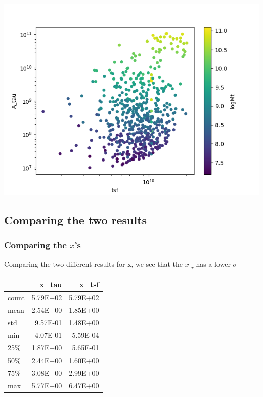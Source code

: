 \documentclass[a4paper,twocolumn]{article}
\begin{document}
\begin{center}
\includegraphics[width=.9\linewidth]{figs/T-A_tau.png}
\end{center}

\subsection{Comparing the two results}
\label{sec:org2d98e85}

\subsubsection{Comparing the \(x\)'s}
\label{sec:org7c16f4c}


Comparing the two different results for x, we see that the \(x|_\tau\) has a lower \(\sigma\)

\begin{table}[hc]
\centering
\begin{tabular}{lrr}
\toprule
{} &    x\_tau &    x\_tsf \\
\midrule
count & 5.79E+02 & 5.79E+02 \\
mean  & 2.54E+00 & 1.85E+00 \\
std   & 9.57E-01 & 1.48E+00 \\
min   & 4.07E-01 & 5.59E-04 \\
25\%   & 1.87E+00 & 5.65E-01 \\
50\%   & 2.44E+00 & 1.60E+00 \\
75\%   & 3.08E+00 & 2.99E+00 \\
max   & 5.77E+00 & 6.47E+00 \\
\bottomrule
\end{tabular}
\end{table}
\end{document}
